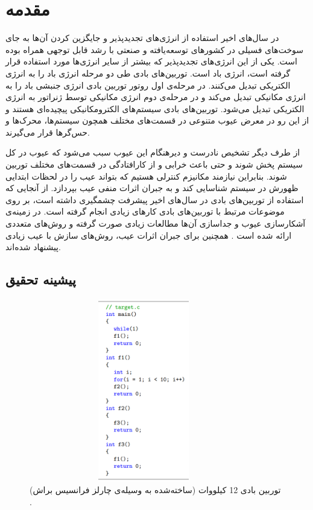 \chapter{مقدمه}

در سال‌های اخیر استفاده از انرژی‌های تجدید‌پذیر و جایگزین کردن آن‌ها به جای سوخت‌های فسیلی در کشور‌های توسعه‌یافته و صنعتی با رشد قابل توجهی همراه بوده است. یکی از این انرژی‌های تجدید‌پذیر که بیشتر از سایر انرژی‌ها مورد استفاده قرار گرفته است، انرژی باد است.  توربین‌های بادی طی دو مرحله انرژی باد را به انرژی الکتریکی تبدیل می‌کنند. در مرحله‌ی اول روتور توربین بادی انرژی جنبشی باد را به انرژی مکانیکی تبدیل می‌کند و در مرحله‌ی دوم انرژی مکانیکی توسط ژنراتور به انرژی الکتریکی تبدیل می‌شود. توربین‌های بادی سیستم‌های الکترومکانیکی پیچیده‌ای هستند و از این رو در معرض عیوب متنوعی در قسمت‌های مختلف همچون سیستم‌ها، محرک‌ها و حس‌گر‌ها قرار می‌گیرند.

از طرف دیگر تشخیص نادرست و دیر‌هنگام این عیوب سبب می‌شود که عیوب در کل سیستم پخش شوند و حتی باعث خرابی و از کار‌افتادگی در قسمت‌های مختلف توربین شوند. بنابراین نیازمند مکانیزم کنترلی هستیم که بتواند عیب را در لحظات ابتدایی ظهورش در سیستم شناسایی کند و به جبران اثرات منفی عیب بپردازد. از آنجایی که استفاده از توربین‌های بادی در سال‌های اخیر پیشرفت چشمگیری داشته است، بر روی موضوعات مرتبط با توربین‌های بادی کارهای زیادی انجام گرفته است. در زمینه‌ی  آشکارسازی عیوب و جداسازی آن‌ها مطالعات زیادی صورت گرفته و روش‌های متعددی ارائه شده است \cite{b6}. همچنین برای جبران اثرات عیب، روش‌های سازش با  عیب زیادی پیشنهاد شده‌اند.
\section{پیشینه تحقیق}
 
 \begin{figure}[t]
 \centering
\includegraphics[height=8cm,width=10cm]{b.png}
\caption{ توربین بادی 12 کیلو‌وات (ساخته‌شده به وسیله‌ی چارلز فرانسیس براش) \cite{b1}.}
\label{wt}
\centering
\end{figure}

